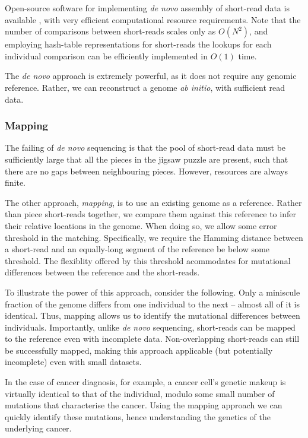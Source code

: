 \documentclass[aps,pra,twocolumn,amsmath,amssymb,nofootinbib,superscriptaddress]{revtex4}
\begin{document}
Open-source software for implementing \textit{de novo} assembly of short-read data is available \cite{velvet}, with very efficient computational resource requirements. Note that the number of comparisons between short-reads scales only as $O(N^2)$, and employing hash-table representations for short-reads the lookups for each individual comparison can be efficiently implemented in $O(1)$ time.

The \textit{de novo} approach is extremely powerful, as it does not require any genomic reference. Rather, we can reconstruct a genome \textit{ab initio}, with sufficient read data.

%
%

\subsubsection{Mapping}

The failing of \textit{de novo} sequencing is that the pool of short-read data must be sufficiently large that all the pieces in the jigsaw puzzle are present, such that there are no gaps between neighbouring pieces. However, resources are always finite.

The other approach, \textit{mapping}, is to use an existing genome as a reference. Rather than piece short-reads together, we compare them against this reference to infer their relative locations in the genome. When doing so, we allow some error threshold in the matching. Specifically, we require the Hamming distance between a short-read and an equally-long segment of the reference be below some threshold. The flexiblity offered by this threshold acommodates for mutational differences between the reference and the short-reads.

To illustrate the power of this approach, consider the following. Only a miniscule fraction of the genome differs from one individual to the next -- almost all of it is identical. Thus, mapping allows us to identify the mutational differences between individuals. Importantly, unlike \textit{de novo} sequencing, short-reads can be mapped to the reference even with incomplete data. Non-overlapping short-reads can still be successfully mapped, making this approach applicable (but potentially incomplete) even with small datasets.

In the case of cancer diagnosis, for example, a cancer cell's genetic makeup is virtually identical to that of the individual, modulo some small number of mutations that characterise the cancer. Using the mapping approach we can quickly identify these mutations, hence understanding the genetics of the underlying cancer.
\end{document}
